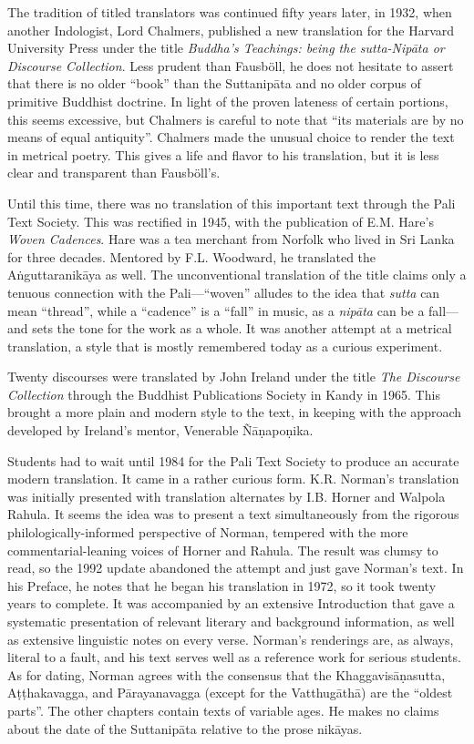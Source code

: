\documentclass[12pt,openany]{book}%
\begin{document}
The tradition of titled translators was continued fifty years later, in 1932, when another Indologist, Lord Chalmers, published a new translation for the Harvard University Press under the title \textit{Buddha’s Teachings: being the sutta-\textsanskrit{Nipāta} or Discourse Collection}. Less prudent than Fausböll, he does not hesitate to assert that there is no older “book” than the \textsanskrit{Suttanipāta} and no older corpus of primitive Buddhist doctrine. In light of the proven lateness of certain portions, this seems excessive, but Chalmers is careful to note that “its materials are by no means of equal antiquity”. Chalmers made the unusual choice to render the text in metrical poetry. This gives a life and flavor to his translation, but it is less clear and transparent than Fausböll’s.

Until this time, there was no translation of this important text through the Pali Text Society. This was rectified in 1945, with the publication of E.M. Hare’s \textit{Woven Cadences}. Hare was a tea merchant from Norfolk who lived in Sri Lanka for three decades. Mentored by F.L. Woodward, he translated the \textsanskrit{Aṅguttaranikāya} as well. The unconventional translation of the title claims only a tenuous connection with the Pali—“woven” alludes to the idea that \textit{sutta} can mean “thread”, while a “cadence” is a “fall” in music, as a \textit{\textsanskrit{nipāta}} can be a fall—and sets the tone for the work as a whole. It was another attempt at a metrical translation, a style that is mostly remembered today as a curious experiment.

Twenty discourses were translated by John Ireland under the title \textit{The Discourse Collection} through the Buddhist Publications Society in Kandy in 1965. This brought a more plain and modern style to the text, in keeping with the approach developed by Ireland’s mentor, Venerable \textsanskrit{Ñāṇapoṇika}.

Students had to wait until 1984 for the Pali Text Society to produce an accurate modern translation. It came in a rather curious form. K.R. Norman’s translation was initially presented with translation alternates by I.B. Horner and Walpola Rahula. It seems the idea was to present a text simultaneously from the rigorous philologically-informed perspective of Norman, tempered with the more commentarial-leaning voices of Horner and Rahula. The result was clumsy to read, so the 1992 update abandoned the attempt and just gave Norman’s text. In his Preface, he notes that he began his translation in 1972, so it took twenty years to complete. It was accompanied by an extensive Introduction that gave a systematic presentation of relevant literary and background information, as well as extensive linguistic notes on every verse. Norman’s renderings are, as always, literal to a fault, and his text serves well as a reference work for serious students. As for dating, Norman agrees with the consensus that the \textsanskrit{Khaggavisāṇasutta}, \textsanskrit{Aṭṭhakavagga}, and \textsanskrit{Pārayanavagga} (except for the \textsanskrit{Vatthugāthā}) are the “oldest parts”. The other chapters contain texts of variable ages. He makes no claims about the date of the \textsanskrit{Suttanipāta} relative to the prose \textsanskrit{nikāyas}.
\end{document}
